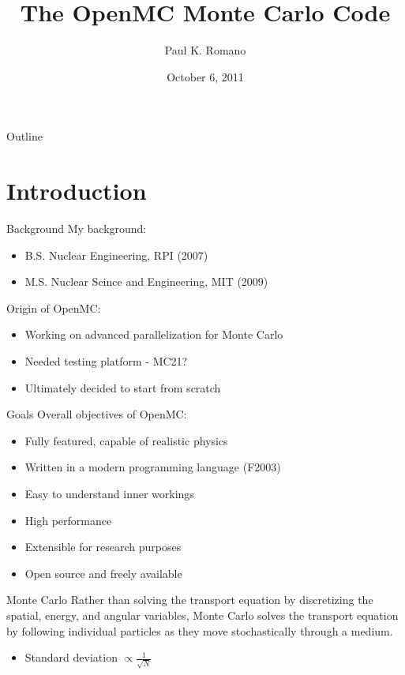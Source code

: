 \documentclass{beamer}
\title{The OpenMC Monte Carlo Code}
\author{Paul K. Romano}
\date{October 6, 2011}
\begin{document}

\frame{\titlepage}

\section[Outline]{}
\begin{frame}{Outline}
  \tableofcontents
\end{frame}

\section{Introduction}

\begin{frame}{Background}
  My background:
  \begin{itemize}
    \item<1-> B.S. Nuclear Engineering, RPI (2007)
    \item<1-> M.S. Nuclear Scince and Engineering, MIT (2009)
  \end{itemize}
  Origin of OpenMC:
  \begin{itemize}
    \item<1-> Working on advanced parallelization for Monte Carlo
    \item<1-> Needed testing platform - MC21?
    \item<1-> Ultimately decided to start from scratch
  \end{itemize}
\end{frame}

\begin{frame}{Goals}
  Overall objectives of OpenMC:
  \begin{itemize}
  \item<1-> Fully featured, capable of realistic physics
  \item<1-> Written in a modern programming language (F2003)
  \item<1-> Easy to understand inner workings
  \item<1-> High performance
  \item<1-> Extensible for research purposes
  \item<1-> Open source and freely available
  \end{itemize}
\end{frame}

\begin{frame}{Monte Carlo}
  Rather than solving the transport equation by discretizing the spatial,
  energy, and angular variables, Monte Carlo solves the transport equation by
  following individual particles as they move stochastically through a medium.
  \begin{itemize}
  \item<1-> Standard deviation $\propto \frac{1}{\sqrt{N}}$
  \end{itemize}
\end{frame}
\end{document}
